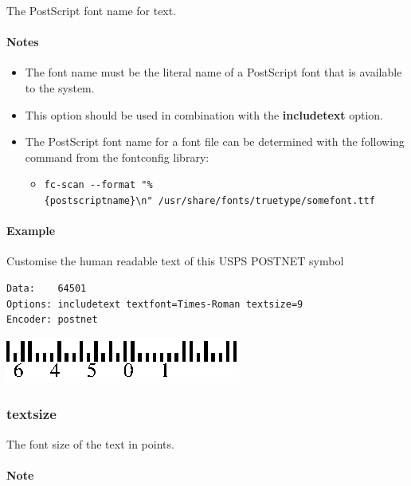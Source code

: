The PostScript font name for text.

\hypertarget{notes-4}{%
\paragraph{Notes}\label{notes-4}}

\begin{itemize}
\tightlist
\item
  The font name must be the literal name of a PostScript font that is
  available to the system.
\item
  This option should be used in combination with the
  \textbf{includetext} option.
\item
  The PostScript font name for a font file can be determined with the
  following command from the fontconfig library:

  \begin{itemize}
  \tightlist
  \item
    \texttt{fc-scan\ -\/-format\ "\%\{postscriptname\}\textbackslash{}n"\ /usr/share/fonts/truetype/somefont.ttf}
  \end{itemize}
\end{itemize}

\hypertarget{example-33}{%
\paragraph{Example}\label{example-33}}

Customise the human readable text of this USPS POSTNET symbol

\begin{verbatim}
Data:    64501
Options: includetext textfont=Times-Roman textsize=9
Encoder: postnet
\end{verbatim}

\includegraphics{images/opttextfont.eps}

\hypertarget{textsize}{%
\subsubsection{textsize}\label{textsize}}

The font size of the text in points.

\hypertarget{note}{%
\paragraph{Note}\label{note}}

